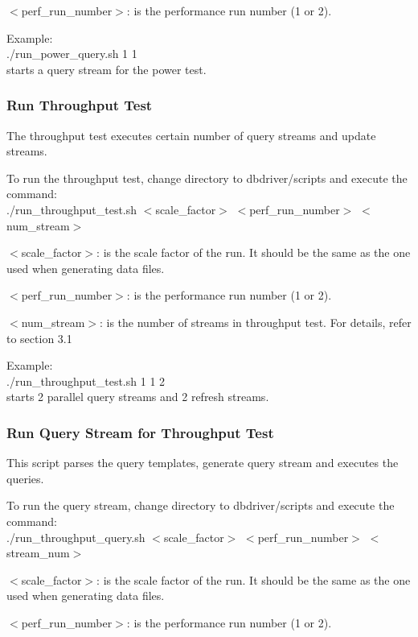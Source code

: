 \documentclass{article}
\begin{document}
\noindent
$<$perf\_run\_number$>$: is the performance run number (1 or 2).  

Example: \\
\indent ./run\_power\_query.sh 1 1 \\
\indent starts a query stream for the power test.  

\subsubsection{Run Throughput Test}

\noindent
The throughput test executes certain number of query streams and update
streams.

\noindent
To run the throughput test, change directory to dbdriver/scripts and
execute the command: \\
\indent ./run\_throughput\_test.sh  $<$scale\_factor$>$ $<$perf\_run\_number$>$  $<$num\_stream$>$

\noindent
$<$scale\_factor$>$: is the scale factor of the run.  It should be the same
as the one used when generating data files.

\noindent
$<$perf\_run\_number$>$: is the performance run number (1 or 2).  

\noindent
$<$num\_stream$>$: is the number of streams in throughput test.  For
details, refer to section 3.1

\noindent
Example: \\
\indent ./run\_throughput\_test.sh 1 1  2 \\
\indent starts 2 parallel query streams and 2 refresh streams.

\subsubsection{Run Query Stream for Throughput Test}

\noindent
This script parses the query templates, generate query stream and
executes the queries.

\noindent
To run the query stream, change directory to dbdriver/scripts and
execute the command: \\
\indent ./run\_throughput\_query.sh  $<$scale\_factor$>$ $<$perf\_run\_number$>$ $<$stream\_num$>$ 

\noindent
$<$scale\_factor$>$: is the scale factor of the run.  It should be the
same as the one used when generating data files.

\noindent
$<$perf\_run\_number$>$: is the performance run number (1 or 2).  
\end{document}
